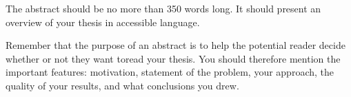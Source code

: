 The abstract should be no more than 350 words long. It should present an
overview of your thesis in accessible language.

Remember that the purpose of an abstract is to help the potential reader decide
whether or not they want toread your thesis. You should therefore mention the
important features: motivation, statement of the problem, your approach, the
quality of your results, and what conclusions you drew.
